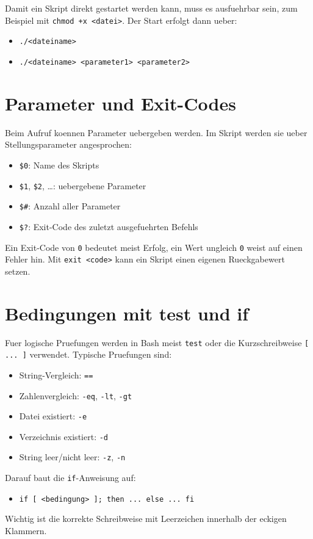\documentclass[11pt, oneside, numbers=noenddot]{scrbook}
\begin{document}
Damit ein Skript direkt gestartet werden kann, muss es ausfuehrbar sein, zum Beispiel mit \texttt{chmod +x <datei>}. Der Start erfolgt dann ueber:
\begin{itemize}
\item \texttt{./<dateiname>}
\item \texttt{./<dateiname> <parameter1> <parameter2>}
\end{itemize}

\section{Parameter und Exit-Codes}
Beim Aufruf koennen Parameter uebergeben werden. Im Skript werden sie ueber Stellungsparameter angesprochen:
\begin{itemize}
\item \texttt{\$0}: Name des Skripts
\item \texttt{\$1}, \texttt{\$2}, \dots: uebergebene Parameter
\item \texttt{\$\#}: Anzahl aller Parameter
\item \texttt{\$?}: Exit-Code des zuletzt ausgefuehrten Befehls
\end{itemize}

Ein Exit-Code von \texttt{0} bedeutet meist Erfolg, ein Wert ungleich \texttt{0} weist auf einen Fehler hin. Mit \texttt{exit <code>} kann ein Skript einen eigenen Rueckgabewert setzen.

\section{Bedingungen mit test und if}
Fuer logische Pruefungen werden in Bash meist \texttt{test} oder die Kurzschreibweise \texttt{[ ... ]} verwendet. Typische Pruefungen sind:
\begin{itemize}
\item String-Vergleich: \texttt{==}
\item Zahlenvergleich: \texttt{-eq}, \texttt{-lt}, \texttt{-gt}
\item Datei existiert: \texttt{-e}
\item Verzeichnis existiert: \texttt{-d}
\item String leer/nicht leer: \texttt{-z}, \texttt{-n}
\end{itemize}

Darauf baut die \texttt{if}-Anweisung auf:
\begin{itemize}
\item \texttt{if [ <bedingung> ]; then ... else ... fi}
\end{itemize}
Wichtig ist die korrekte Schreibweise mit Leerzeichen innerhalb der eckigen Klammern.
\end{document}
